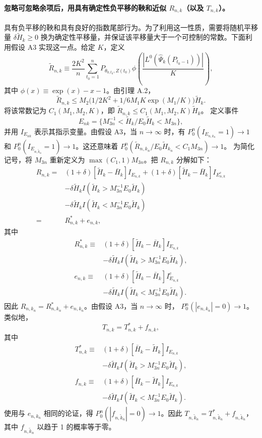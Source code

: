 \paragraph{忽略可忽略余项后，用具有确定性负平移的鞅和近似 $R_{n,k}$（以及 $T_{n,k}$）。}
具有负平移的鞅和具有良好的指数尾部行为。为了利用这一性质，需要将随机平移量 $\delta\widetilde H_k\ge0$ 换为确定性平移量，并保证该平移量大于一个可控制的常数。下面利用假设 A3 实现这一点。给定 $K$，定义
\[
\widetilde R_{n,k}\equiv\frac{2K^2}{n}\sum_{t_0=1}^n
 P_{\theta_{0,t_0},Z(t_0)}
 \phi\left(\frac{|L^0(\widehat\Psi_k(P_{t_0-1}))|}{K}\right),
\]
其中 $\phi(x)\equiv\exp(x)-x-1$。由引理 A.2，
\[
\widetilde R_{n,k}\le
 M_2\bigl(1/2K^2+1/6M_1K\exp(M_1/K)\bigr)\widetilde H_k.
\]
将该常数记为 $C_1(M_1,M_2,K)$，即
$\widetilde R_{n,k}\le C_1(M_1,M_2,K)\widetilde H_k$。
定义事件
\[
E_{nk}=\{M_{3n}^{-1}<\widetilde H_k/E_0\widetilde H_k<M_{3n}\},
\]
并用 $I_{E_{nk}}$ 表示其指示变量。由假设 A3，当 $n\to\infty$ 时，有
$P_0^n(I_{E_{n,k_n}}=1)\to1$ 和
$P_0^n(I_{E_{n,\widetilde k_n}}=1)\to1$。这还意味着
$P_0^n(\widetilde R_{n,k_n}/E_0\widetilde H_{k_n}<C_1M_{3n})\to1$。
为简化记号，将 $M_{3n}$ 重新定义为 $\max(C_1,1)M_{3n}$。把 $R_{n,k}$ 分解如下：
\[
\begin{aligned}
R_{n,k}={}&(1+\delta)[\widetilde H_k-\bar H_k]I_{E_{n,k}}
 +(1+\delta)[\widetilde H_k-\bar H_k]I_{E_{n,k}^c}\\
&-\delta\widetilde H_k I(\widetilde H_k>M_{3n}^{-1}E_0\widetilde H_k)\\
&-\delta\widetilde H_k I(\widetilde H_k<M_{3n}^{-1}E_0\widetilde H_k)\\
={}&R^*_{n,k}+e_{n,k},
\end{aligned}
\]
其中
\[
\begin{aligned}
R^*_{n,k}\equiv{}&(1+\delta)[\widetilde H_k-\bar H_k]I_{E_{n,k}}\\
&-\delta\widetilde H_k I(\widetilde H_k>M_{3n}^{-1}E_0\widetilde H_k),\\
e_{n,k}\equiv{}&(1+\delta)[\widetilde H_k-\bar H_k]I^c_{E_{n,k}}\\
&-\delta\widetilde H_k I(\widetilde H_k<M_{3n}^{-1}E_0\widetilde H_k).
\end{aligned}
\]
因此 $R_{n,k_n}=R^*_{n,k_n}+e_{n,k_n}$。由假设 A3，当 $n\to\infty$ 时，
$P_0^n(|e_{n,k_n}|=0)\to1$。类似地，
\[
T_{n,k}=T^*_{n,k}+f_{n,k},
\]
其中
\[
\begin{aligned}
T^*_{n,k}\equiv{}&(1+\delta)[\bar H_k-\widetilde H_k]I_{E_{n,k}}\\
&-\delta\widetilde H_k I(\widetilde H_k>M_{3n}^{-1}E_0\widetilde H_k),\\
f_{n,k}\equiv{}&(1+\delta)[\bar H_k-\widetilde H_k]I_{E_{n,k}}\\
&-\delta\widetilde H_k I(\widetilde H_k<M_{3n}^{-1}E_0\widetilde H_k).
\end{aligned}
\]
使用与 $e_{n,k_n}$ 相同的论证，得
$P_0^n(|f_{n,\widetilde k_n}|=0)\to1$。因此
$T_{n,\widetilde k_n}=T^*_{n,\widetilde k_n}+f_{n,\widetilde k_n}$，其中
$f_{n,\widetilde k_n}$ 以趋于 1 的概率等于零。


